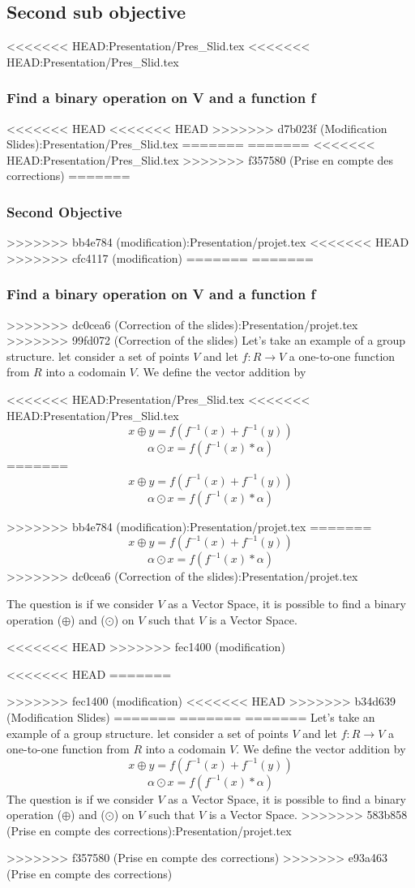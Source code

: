 \documentclass{beamer}
\begin{document}
\begin{frame}
\begin{frame}
\begin{frame}
\begin{frame}
\begin{frame}
\begin{frame}
\begin{frame}
\subsection{Second sub objective}
\begin{frame}
<<<<<<< HEAD:Presentation/Pres_Slid.tex
<<<<<<< HEAD:Presentation/Pres_Slid.tex
    \frametitle{Find a binary operation on V and a function f }
<<<<<<< HEAD
<<<<<<< HEAD
>>>>>>> d7b023f (Modification Slides):Presentation/Pres_Slid.tex
=======
=======
<<<<<<< HEAD:Presentation/Pres_Slid.tex
>>>>>>> f357580 (Prise en compte des corrections)
=======
    \frametitle{Second Objective}
>>>>>>> bb4e784 (modification):Presentation/projet.tex
<<<<<<< HEAD
>>>>>>> cfc4117 (modification)
=======
=======
    \frametitle{Find a binary operation on V and a function f }
>>>>>>> dc0cea6 (Correction of the slides):Presentation/projet.tex
>>>>>>> 99fd072 (Correction of the slides)
	Let's take an example of a group structure.
	let consider a set of points  $ V $ and let  $ f: R \rightarrow V $ a one-to-one
	function from $R$ into a codomain $V$. We define the vector addition by
	
<<<<<<< HEAD:Presentation/Pres_Slid.tex
<<<<<<< HEAD:Presentation/Pres_Slid.tex
    $$ x \oplus y = f(f^{-1}(x) + f^{-1}(y)) $$
    $$ \alpha \odot x = f(f^{-1}(x) * \alpha) $$
=======
     $$ x \oplus y = f(f^{-1}(x) + f^{-1}(y)) $$
     $$ \alpha \odot x = f(f^{-1}(x) * \alpha) $$
		
>>>>>>> bb4e784 (modification):Presentation/projet.tex
=======
    $$ x \oplus y = f(f^{-1}(x) + f^{-1}(y)) $$
    $$ \alpha \odot x = f(f^{-1}(x) * \alpha) $$
>>>>>>> dc0cea6 (Correction of the slides):Presentation/projet.tex

	The question is if we consider $V$ as a Vector Space, it is possible to find a binary operation ($\oplus$) and ($\odot$) on $V$ such that $V$ is a Vector Space.
	
<<<<<<< HEAD
>>>>>>> fec1400 (modification)
\end{frame}
<<<<<<< HEAD
=======

>>>>>>> fec1400 (modification)
<<<<<<< HEAD
>>>>>>> b34d639 (Modification Slides)
=======
=======
=======
    Let's take an example of a group structure.
    let consider a set of points  $ V $ and let  $ f: R \rightarrow V $ a one-to-one
    function from $R$ into a codomain $V$. We define the vector addition by
    $$ x \oplus y = f(f^{-1}(x) + f^{-1}(y)) $$
    $$ \alpha \odot x = f(f^{-1}(x) * \alpha) $$
    The question is if we consider $V$ as a Vector Space, it is possible to find a binary operation ($\oplus$) and ($\odot$) on $V$ such that $V$ is a Vector Space.
>>>>>>> 583b858 (Prise en compte des corrections):Presentation/projet.tex
\end{frame}
>>>>>>> f357580 (Prise en compte des corrections)
>>>>>>> e93a463 (Prise en compte des corrections)

\end{frame}
\end{frame}
\end{frame}
\end{frame}
\end{frame}
\end{frame}
\end{document}

